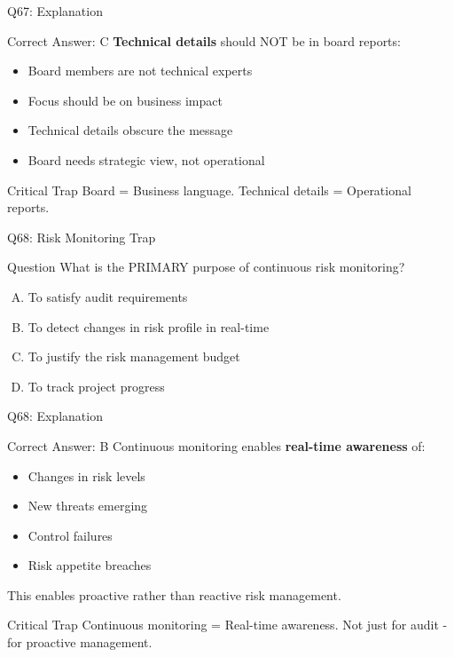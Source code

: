 \documentclass{beamer}
\begin{document}
	\begin{frame}{Q67: Explanation}
		\begin{block}{Correct Answer: C}
			\textbf{Technical details} should NOT be in board reports:
			\begin{itemize}
				\item Board members are not technical experts
				\item Focus should be on business impact
				\item Technical details obscure the message
				\item Board needs strategic view, not operational
			\end{itemize}
		\end{block}
		\begin{alertblock}{Critical Trap}
			Board = Business language.
			Technical details = Operational reports.
		\end{alertblock}
	\end{frame}
	
	\begin{frame}{Q68: Risk Monitoring Trap}
		\begin{block}{Question}
			What is the PRIMARY purpose of continuous risk monitoring?
		\end{block}
		\begin{enumerate}[(A)]
			\item To satisfy audit requirements
			\item To detect changes in risk profile in real-time
			\item To justify the risk management budget
			\item To track project progress
		\end{enumerate}
	\end{frame}
	
	\begin{frame}{Q68: Explanation}
		\begin{block}{Correct Answer: B}
			Continuous monitoring enables \textbf{real-time awareness} of:
			\begin{itemize}
				\item Changes in risk levels
				\item New threats emerging
				\item Control failures
				\item Risk appetite breaches
			\end{itemize}
			This enables proactive rather than reactive risk management.
		\end{block}
		\begin{alertblock}{Critical Trap}
			Continuous monitoring = Real-time awareness.
			Not just for audit - for proactive management.
		\end{alertblock}
	\end{frame}
	
\end{document}
